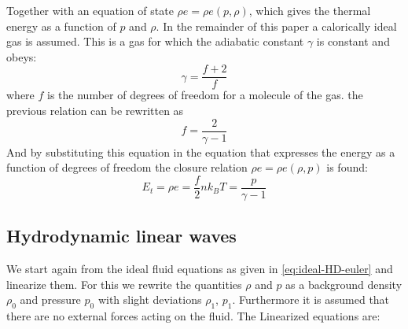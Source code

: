 Together with an equation of state $\rho e = \rho e(p, \rho)$, which gives the thermal energy as a function of $p$ and $\rho$.
In the remainder of this paper a calorically ideal gas is assumed. This is a gas for which the adiabatic constant $\gamma$ is constant and obeys:
\begin{equation}
	\gamma = \frac{f+2}{f}
	\label{eq:adiabatic constant}
\end{equation}
where $f$ is the number of degrees of freedom for a molecule of the gas. the previous relation can be rewritten as
\begin{equation*}
	f = \frac{2}{\gamma-1}
\end{equation*}
And by substituting this equation in the equation that expresses the energy as a function of degrees of freedom the closure relation $\rho e= \rho e(\rho, p)$ is found:
\begin{equation*}
	E_t = \rho e = \frac{f}{2}nk_BT = \frac{p}{\gamma-1}
\end{equation*}
\subsection{Hydrodynamic linear waves}
We start again from the ideal fluid equations as given in \autoref{eq:ideal-HD-euler} and linearize them.
For this we rewrite the quantities $\rho$ and $p$ as a background density $\rho_0$ and pressure $p_0$ with slight deviations $\rho_1$, $p_1$.
Furthermore it is assumed that there are no external forces acting on the fluid. The Linearized equations are:

